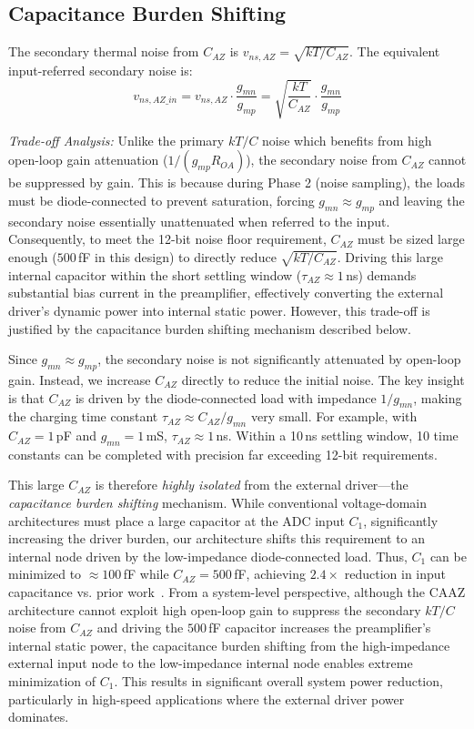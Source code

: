 \documentclass[journal]{IEEEtran}
\begin{document}
\subsection{Capacitance Burden Shifting}
The secondary thermal noise from $C_{AZ}$ is $v_{ns,AZ} = \sqrt{kT/C_{AZ}}$. The equivalent input-referred secondary noise is:
\begin{equation}
v_{ns,AZ\_in} = v_{ns,AZ} \cdot \frac{g_{mn}}{g_{mp}} = \sqrt{\frac{kT}{C_{AZ}}} \cdot \frac{g_{mn}}{g_{mp}}
\label{eq:caz_noise}
\end{equation}

\textit{Trade-off Analysis:} Unlike the primary $kT/C$ noise which benefits from high open-loop gain attenuation ($1/(g_{mp}R_{OA})$), the secondary noise from $C_{AZ}$ cannot be suppressed by gain. This is because during Phase 2 (noise sampling), the loads must be diode-connected to prevent saturation, forcing $g_{mn} \approx g_{mp}$ and leaving the secondary noise essentially unattenuated when referred to the input. Consequently, to meet the 12-bit noise floor requirement, $C_{AZ}$ must be sized large enough ($500$\,fF in this design) to directly reduce $\sqrt{kT/C_{AZ}}$. Driving this large internal capacitor within the short settling window ($\tau_{AZ} \approx 1$\,ns) demands substantial bias current in the preamplifier, effectively converting the external driver's dynamic power into internal static power. However, this trade-off is justified by the capacitance burden shifting mechanism described below.

Since $g_{mn} \approx g_{mp}$, the secondary noise is not significantly attenuated by open-loop gain. Instead, we increase $C_{AZ}$ directly to reduce the initial noise. The key insight is that $C_{AZ}$ is driven by the diode-connected load with impedance $1/g_{mn}$, making the charging time constant $\tau_{AZ} \approx C_{AZ}/g_{mn}$ very small. For example, with $C_{AZ} = 1$\,pF and $g_{mn} = 1$\,mS, $\tau_{AZ} \approx 1$\,ns. Within a 10\,ns settling window, 10 time constants can be completed with precision far exceeding 12-bit requirements.

This large $C_{AZ}$ is therefore \textit{highly isolated} from the external driver---the \textit{capacitance burden shifting} mechanism. While conventional voltage-domain architectures must place a large capacitor at the ADC input $C_1$, significantly increasing the driver burden, our architecture shifts this requirement to an internal node driven by the low-impedance diode-connected load. Thus, $C_1$ can be minimized to $\approx 100$\,fF while $C_{AZ} = 500$\,fF, achieving $2.4\times$ reduction in input capacitance vs. prior work~\cite{liu202013bit}. From a system-level perspective, although the CAAZ architecture cannot exploit high open-loop gain to suppress the secondary $kT/C$ noise from $C_{AZ}$ and driving the $500$\,fF capacitor increases the preamplifier's internal static power, the capacitance burden shifting from the high-impedance external input node to the low-impedance internal node enables extreme minimization of $C_1$. This results in significant overall system power reduction, particularly in high-speed applications where the external driver power dominates.
\end{document}

